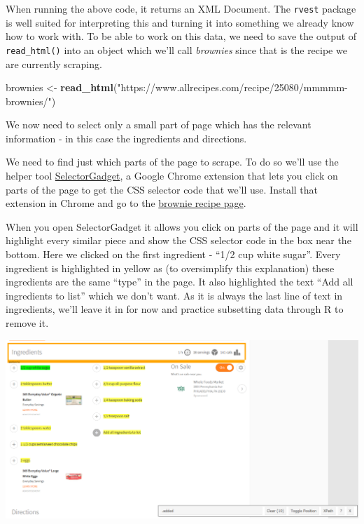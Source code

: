 \documentclass[
  12pt,
]{book}
\newenvironment{Shaded}{\begin{snugshade}}{\end{snugshade}}
\newcommand{\KeywordTok}[1]{\textcolor[rgb]{0.27,0.27,0.27}{\textbf{#1}}}
\newcommand{\NormalTok}[1]{#1}
\newcommand{\StringTok}[1]{\textcolor[rgb]{0.5,0.5,0.5}{#1}}
\begin{document}
When running the above code, it returns an XML Document. The \texttt{rvest} package is well suited for interpreting this and turning it into something we already know how to work with. To be able to work on this data, we need to save the output of \texttt{read\_html()} into an object which we'll call \emph{brownies} since that is the recipe we are currently scraping.

\begin{Shaded}
\begin{Highlighting}[]
\NormalTok{brownies <{-}}\StringTok{ }\KeywordTok{read\_html}\NormalTok{(}\StringTok{"https://www.allrecipes.com/recipe/25080/mmmmm{-}brownies/"}\NormalTok{)}
\end{Highlighting}
\end{Shaded}

We now need to select only a small part of page which has the relevant information - in this case the ingredients and directions.

We need to find just which parts of the page to scrape. To do so we'll use the helper tool \href{https://selectorgadget.com/}{SelectorGadget}, a Google Chrome extension that lets you click on parts of the page to get the CSS selector code that we'll use. Install that extension in Chrome and go to the \href{https://www.allrecipes.com/recipe/25080/mmmmm-brownies/?internalSource=hub\%20recipe\&referringContentType=Search}{brownie recipe page}.

When you open SelectorGadget it allows you click on parts of the page and it will highlight every similar piece and show the CSS selector code in the box near the bottom. Here we clicked on the first ingredient - ``1/2 cup white sugar''. Every ingredient is highlighted in yellow as (to oversimplify this explanation) these ingredients are the same ``type'' in the page. It also highlighted the text ``Add all ingredients to list'' which we don't want. As it is always the last line of text in ingredients, we'll leave it in for now and practice subsetting data through R to remove it.

\includegraphics{images/brownies_3.PNG}
\end{document}
